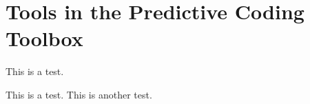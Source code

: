 \hypertarget{group__tools}{\section{Tools in the Predictive Coding Toolbox}
\label{group__tools}
}


This is a test.  


This is a test. This is another test.